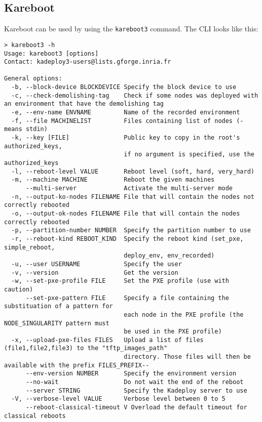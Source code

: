 \documentclass[a4wide,10pt,oneside]{book}
\begin{document}
\subsection{Kareboot}
Kareboot can be used by using the \texttt{kareboot3} command. The CLI looks like this:
\begin{small}
\begin{verbatim}
> kareboot3 -h
Usage: kareboot3 [options]
Contact: kadeploy3-users@lists.gforge.inria.fr

General options:
  -b, --block-device BLOCKDEVICE Specify the block device to use
  -c, --check-demolishing-tag    Check if some nodes was deployed with an environment that have the demolishing tag
  -e, --env-name ENVNAME         Name of the recorded environment
  -f, --file MACHINELIST         Files containing list of nodes (- means stdin)
  -k, --key [FILE]               Public key to copy in the root's authorized_keys,
                                 if no argument is specified, use the authorized_keys
  -l, --reboot-level VALUE       Reboot level (soft, hard, very_hard)
  -m, --machine MACHINE          Reboot the given machines
      --multi-server             Activate the multi-server mode
  -n, --output-ko-nodes FILENAME File that will contain the nodes not correctly rebooted
  -o, --output-ok-nodes FILENAME File that will contain the nodes correctly rebooted
  -p, --partition-number NUMBER  Specify the partition number to use
  -r, --reboot-kind REBOOT_KIND  Specify the reboot kind (set_pxe, simple_reboot,
                                 deploy_env, env_recorded)
  -u, --user USERNAME            Specify the user
  -v, --version                  Get the version
  -w, --set-pxe-profile FILE     Set the PXE profile (use with caution)
      --set-pxe-pattern FILE     Specify a file containing the substituation of a pattern for
                                 each node in the PXE profile (the NODE_SINGULARITY pattern must
                                 be used in the PXE profile)
  -x, --upload-pxe-files FILES   Upload a list of files (file1,file2,file3) to the "tftp_images_path"
                                 directory. Those files will then be available with the prefix FILES_PREFIX--
      --env-version NUMBER       Specify the environment version
      --no-wait                  Do not wait the end of the reboot
      --server STRING            Specify the Kadeploy server to use
  -V, --verbose-level VALUE      Verbose level between 0 to 5
      --reboot-classical-timeout V Overload the default timeout for classical reboots
\end{verbatim}
\end{small}
\end{document}
